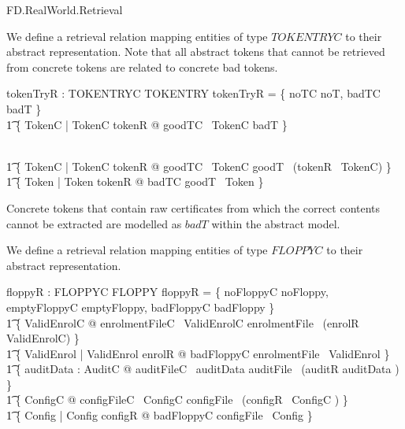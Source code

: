 \begin{traceunit}{FD.RealWorld.Retrieval}
\end{traceunit}

We define a retrieval relation mapping entities of type $TOKENTRYC$ to
their abstract representation.
Note that all abstract tokens that cannot be retrieved from concrete
tokens are related to concrete bad tokens. 

\begin{axdef}
        tokenTryR : TOKENTRYC \rel TOKENTRY
\where
        tokenTryR = \{ noTC \mapsto noT, badTC \mapsto badT \}
\\ \t1  \cup \{ TokenC | \theta TokenC \notin \dom tokenR @ goodTC~
\theta TokenC \mapsto badT \}
 
\\ \t1  \cup \{ TokenC | \theta TokenC \in \dom tokenR  @ goodTC~ \theta TokenC \mapsto goodT~
(tokenR~ \theta TokenC) \}    
\\ \t1  \cup \{ Token | \theta Token \in \ran tokenR @ badTC \mapsto
goodT~ \theta Token \}
\end{axdef}
\begin{Zcomment}
\item
Concrete tokens that contain raw certificates from which the
correct contents cannot be extracted are modelled as $badT$ within the
abstract model.
\end{Zcomment}

We define a retrieval relation mapping entities of type $FLOPPYC$ to
their abstract representation.

\begin{axdef}
        floppyR : FLOPPYC \rel FLOPPY
\where
        floppyR = \{ noFloppyC \mapsto noFloppy, emptyFloppyC \mapsto
        emptyFloppy,  badFloppyC \mapsto badFloppy \}
\\ \t1  \cup \{ ValidEnrolC @ enrolmentFileC~ \theta ValidEnrolC \mapsto enrolmentFile~
        (enrolR~ \theta ValidEnrolC) \}
\\ \t1  \cup \{ ValidEnrol | \theta ValidEnrol \notin \ran enrolR @ badFloppyC
\mapsto  enrolmentFile~ \theta ValidEnrol \}
\\ \t1  \cup \{ auditData : \finset AuditC @ auditFileC~ auditData
\mapsto auditFile~ (auditR \limg auditData \rimg) \} 
\\ \t1  \cup \{ ConfigC  @ 
        configFileC~ \theta ConfigC \mapsto configFile~ (configR~
        \theta ConfigC )
        \} 
\\ \t1 \cup \{ Config | \theta Config \notin \ran configR @ badFloppyC
        \mapsto configFile~ \theta Config \}   
\end{axdef}

